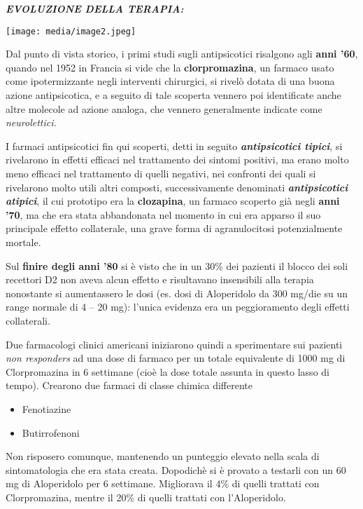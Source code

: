 \documentclass[]{article}
\begin{document}
\textbf{\emph{EVOLUZIONE DELLA TERAPIA:}}

\texttt{[image: media/image2.jpeg]}

Dal punto di vista storico, i primi studi sugli antipsicotici risalgono
agli \textbf{anni '60}, quando nel 1952 in Francia si vide che la
\textbf{clorpromazina}, un farmaco usato come ipotermizzante negli
interventi chirurgici, si rivelò dotata di una buona azione
antipsicotica, e a seguito di tale scoperta vennero poi identificate
anche altre molecole ad azione analoga, che vennero generalmente
indicate come \emph{neurolettici.}

I farmaci antipsicotici fin qui scoperti, detti in seguito
\textbf{\emph{antipsicotici tipici}}, si rivelarono in effetti efficaci
nel trattamento dei sintomi positivi, ma erano molto meno efficaci nel
trattamento di quelli negativi, nei confronti dei quali si rivelarono
molto utili altri composti, successivamente denominati
\textbf{\emph{antipsicotici atipici}}, il cui prototipo era la
\textbf{clozapina}, un farmaco scoperto già negli \textbf{anni '70}, ma
che era stata abbandonata nel momento in cui era apparso il suo
principale effetto collaterale, una grave forma di agranulocitosi
potenzialmente mortale.

Sul \textbf{finire degli anni '80} si è visto che in un 30\% dei
pazienti il blocco dei soli recettori D2 non aveva alcun effetto e
risultavano insensibili alla terapia nonostante si aumentassero le dosi
(es. dosi di Aloperidolo da 300 mg/die su un range normale di 4 -- 20
mg): l'unica evidenza era un peggioramento degli effetti collaterali.

Due farmacologi clinici americani iniziarono quindi a sperimentare sui
pazienti \emph{non responders} ad una dose di farmaco per un totale
equivalente di 1000 mg di Clorpromazina in 6 settimane (cioè la dose
totale assunta in questo lasso di tempo). Crearono due farmaci di classe
chimica differente

\begin{itemize}
\item
  Fenotiazine
\item
  Butirrofenoni
\end{itemize}

Non risposero comunque, mantenendo un punteggio elevato nella scala di
sintomatologia che era stata creata. Dopodichè si è provato a testarli
con un 60 mg di Aloperidolo per 6 settimane. Migliorava il 4\% di quelli
trattati con Clorpromazina, mentre il 20\% di quelli trattati con
l'Aloperidolo.
\end{document}
